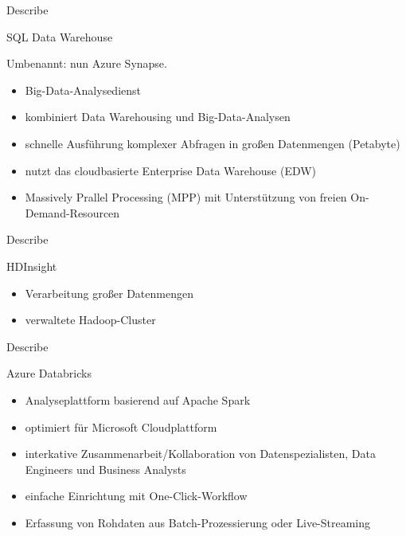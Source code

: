 \documentclass{scrartcl}
\newenvironment{flashcard}[2][]{%
    #1
    \vfill
    \centerline{\Large{#2}}
    \vfill
\newpage
}
{\newpage}
\begin{document}
    \begin{flashcard}[Describe]{SQL Data Warehouse}
        Umbenannt: nun Azure Synapse.

        \begin{itemize}
            \item Big-Data-Analysedienst
            \item kombiniert Data Warehousing und Big-Data-Analysen
            \item schnelle Ausführung komplexer Abfragen in großen Datenmengen (Petabyte)
            \item nutzt das cloudbasierte Enterprise Data Warehouse (EDW)
            \item Massively Prallel Processing (MPP) mit Unterstützung von freien On-Demand-Resourcen
        \end{itemize}
    \end{flashcard}

    \begin{flashcard}[Describe]{HDInsight}
        \begin{itemize}
            \item Verarbeitung großer Datenmengen
            \item verwaltete Hadoop-Cluster
        \end{itemize}
    \end{flashcard}

    \begin{flashcard}[Describe]{Azure Databricks}
        \begin{itemize}
            \item Analyseplattform basierend auf Apache Spark
            \item optimiert für Microsoft Cloudplattform
            \item interkative Zusammenarbeit/Kollaboration von Datenspezialisten, Data Engineers und Business Analysts
            \item einfache Einrichtung mit One-Click-Workflow
            \item Erfassung von Rohdaten aus Batch-Prozessierung oder Live-Streaming
        \end{itemize}
    \end{flashcard}
\end{document}
